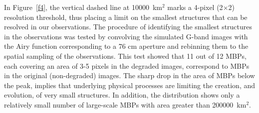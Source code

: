 \documentclass{emulateapj}
\begin{document}
In Figure~\ref{f4}, the vertical dashed line at 10000~km$^{2}$ marks a 4-pixel (2$\times$2) resolution threshold, thus placing a limit on the smallest structures that can be resolved in our observations. The procedure of identifying the smallest structures in the observations was tested by convolving the simulated G-band images with the Airy function corresponding to a 76 cm aperture and rebinning them to the spatial sampling of the observations. 
This test showed that 11 out of 12 MBPs, each covering an area of 3-5 pixels in the degraded images, correspond to MBPs in the original (non-degraded) images.  
The sharp drop in the area of MBPs below the peak, implies that underlying physical processes are limiting the creation, and evolution, of very small  structures.
In addition, the distribution shows only a relatively small number of large-scale MBPs with area greater than 200000~km$^2$.  
\end{document}
